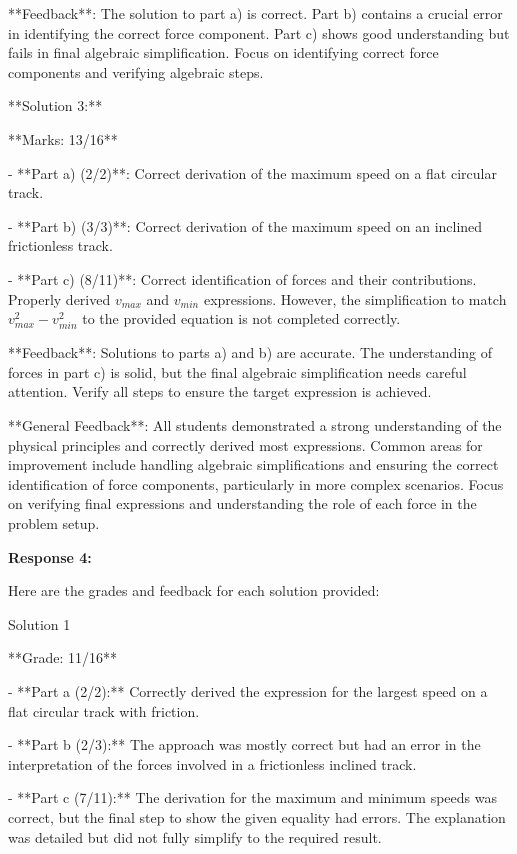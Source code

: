 \documentclass[a4paper,11pt]{article}
\begin{document}
**Feedback**: The solution to part a) is correct. Part b) contains a crucial error in identifying the correct force component. Part c) shows good understanding but fails in final algebraic simplification. Focus on identifying correct force components and verifying algebraic steps.

**Solution 3:**

**Marks: 13/16**

- **Part a) (2/2)**: Correct derivation of the maximum speed on a flat circular track.

- **Part b) (3/3)**: Correct derivation of the maximum speed on an inclined frictionless track.

- **Part c) (8/11)**: Correct identification of forces and their contributions. Properly derived \(v_{max}\) and \(v_{min}\) expressions. However, the simplification to match \(v_{max}^2 - v_{min}^2\) to the provided equation is not completed correctly.

**Feedback**: Solutions to parts a) and b) are accurate. The understanding of forces in part c) is solid, but the final algebraic simplification needs careful attention. Verify all steps to ensure the target expression is achieved.

**General Feedback**: All students demonstrated a strong understanding of the physical principles and correctly derived most expressions. Common areas for improvement include handling algebraic simplifications and ensuring the correct identification of force components, particularly in more complex scenarios. Focus on verifying final expressions and understanding the role of each force in the problem setup.

\bigskip
\textbf{Response 4:}

Here are the grades and feedback for each solution provided:

Solution 1

**Grade: 11/16**

- **Part a (2/2):** Correctly derived the expression for the largest speed on a flat circular track with friction.

- **Part b (2/3):** The approach was mostly correct but had an error in the interpretation of the forces involved in a frictionless inclined track.

- **Part c (7/11):** The derivation for the maximum and minimum speeds was correct, but the final step to show the given equality had errors. The explanation was detailed but did not fully simplify to the required result.
\end{document}

